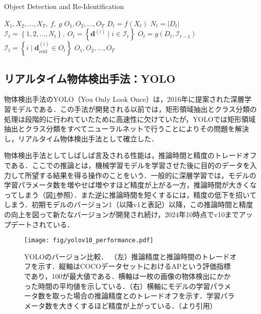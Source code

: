         \begin{algorithm}[t]
            \caption{Object Detection and Re-Identification}
            \label{alg:object_detection_and_reidentification}
            \begin{algorithmic}[1]
                \Require $X_1, X_2, \dots, X_T, ~f, ~g$
                \Ensure $O_1, O_2, \dots, O_T$
                    \State $D_t = f(X_t)$
                    \State $ N_t = \left|D_t\right|$
                        \State $\mathcal{I}_t = \left\{1, 2, \dots, N_t\right\}, ~ O_t = \left\{\bm{d}^{(i)} \mid i \in \mathcal{I}_t\right\}$
                    \Else
                        \State $O_t = g(D_t, \mathcal{I}_{t-1})$
                        \State $\mathcal{I}_t = \left\{i \mid \bm{d}_{\text{reid}}^{(i)} \in O_t\right\}$
                    \EndIf
                \EndFor
                \State \Return $O_1, O_2, \dots, O_T$
            \end{algorithmic}
        \end{algorithm}

    \subsection{リアルタイム物体検出手法：YOLO}
    \label{subsec:object_detection}

    物体検出手法のYOLO（You Only Look Once）\cite{redmon2016you, alif2024yolov1}は，2016年に提案された深層学習モデルである．この手法が開発される以前では，矩形領域抽出とクラス分類の処理は段階的に行われていた\cite{girshick2014rich,girshick2015fast,ren2016faster}ために高速性に欠けていたが，YOLOでは矩形領域抽出とクラス分類をすべてニューラルネットで行うことによりその問題を解決し，リアルタイム物体検出手法として確立した．

    物体検出手法としてしばしば言及される性能は，推論時間と精度のトレードオフである．ここでの推論とは，機械学習モデルを学習させた後に目的のデータを入力して所望する結果を得る操作のことをいう．一般的に深層学習では，モデルの学習パラメータ数を増やせば増やすほど精度が上がる一方，推論時間が大きくなってしまう（図\ref{fig:yolo_tradeoff}参照）．また逆に推論時間を短くするには，精度の低下を招いてしまう．初期モデルのバージョン1（以降v1と表記）以降，この推論時間と精度の向上を図って新たなバージョンが開発され続け，2024年10時点でv10までアップデートされている．

    \begin{figure}[t]
        \centering
        \texttt{[image: fig/yolov10\_performance.pdf]}
        \caption[YOLOのバージョン比較]{YOLOのバージョン比較．
        （左）推論精度と推論時間のトレードオフを示す．縦軸はCOCOデータセットにおけるAPという評価指標であり，100が最大値である．横軸は一枚の画像の物体検出にかかった時間の平均値を示している．（右）横軸にモデルの学習パラメータ数を取った場合の推論精度とのトレードオフを示す．学習パラメータ数を大きくするほど精度が上がっている．（\cite{wang2024yolov10}より引用）}
        \label{fig:yolo_tradeoff}
    \end{figure}    

